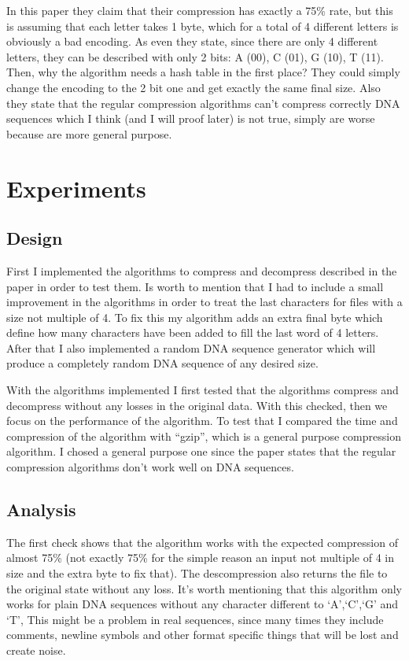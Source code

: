 \documentclass[conference,a4paper]{IEEEtran}
\begin{document}
In this paper they claim that their compression has exactly a 75\% rate, but this is assuming that each letter takes 1 byte, which for a total of 4 different letters is obviously a bad encoding. As even they state, since there are only 4 different letters, they can be described with only 2 bits: A (00), C (01), G (10), T (11). Then, why the algorithm needs a hash table in the first place? They could simply change the encoding to the 2 bit one and get exactly the same final size. Also they state that the regular compression algorithms can't compress correctly DNA sequences which I think (and I will proof later) is not true, simply are worse because are more general purpose.

\section{Experiments}
\subsection{Design}
First I implemented the algorithms to compress and decompress described in the paper in order to test them. Is worth to mention that I had to include a small improvement in the algorithms in order to treat the last characters for files with a size not multiple of 4. To fix this my algorithm adds an extra final byte which define how many characters have been added to fill the last word of 4 letters. After that I also implemented a random DNA sequence generator which will produce a completely random DNA sequence of any desired size.

With the algorithms implemented I first tested that the algorithms compress and decompress without any losses in the original data. With this checked, then we focus on the performance of the algorithm. To test that I compared the time and compression of the algorithm with ``gzip'', which is a general purpose compression algorithm. I chosed a general purpose one since the paper states that the regular compression algorithms don't work well on DNA sequences. 
\subsection{Analysis}
The first check shows that the algorithm works with the expected compression of almost 75\% (not exactly 75\% for the simple reason an input not multiple of 4 in size and the extra byte to fix that). The descompression also returns the file to the original state without any loss. It's worth mentioning that this algorithm only works for plain DNA sequences without any character different to `A',`C',`G' and `T', This might be a problem in real sequences, since many times they include comments, newline symbols and other format specific things that will be lost and create noise.
\end{document}
